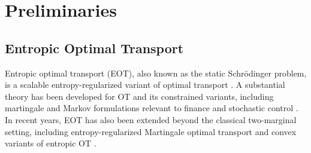 \documentclass[11pt]{article}
\theoremstyle{definition}
\numberwithin{equation}{section}%
\begin{document}


\section{Preliminaries}

\subsection{Entropic Optimal Transport}
\label{sec:prelim-eot-sb}
Entropic optimal transport (EOT), also known as the static Schr\"odinger problem, is a scalable entropy-regularized variant of optimal transport \citep{cuturi2013sinkhorn,peyre2019computational}.
A substantial theory has been developed for OT and its constrained variants, including martingale and Markov formulations relevant to finance and stochastic control \citep{carlier2017convergence,nutz2021introduction}.
In recent years, EOT has also been extended beyond the classical two-marginal setting, including entropy-regularized Martingale optimal transport \citep{henry2019martingale,chen2026convergence} and convex variants of entropic OT \citep{kazeykina2025entropic}.
\end{document}
